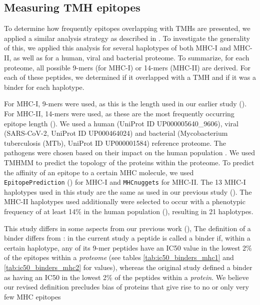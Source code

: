 \subsection{Measuring TMH epitopes}

To determine how frequently epitopes overlapping with TMHs are presented,
we applied a similar analysis strategy as described in \cite{bianchi2017}.
To investigate the generality of this, we applied this analysis
for several haplotypes of both MHC-I and MHC-II, 
as well as for a human, viral and bacterial proteome.
To summarize, for each proteome, 
all possible 9-mers (for MHC-I) or 14-mers (MHC-II) are derived. 
For each of these peptides, we determined if it overlapped with a 
TMH and if it was a binder for each haplotype.

For MHC-I, 9-mers were used, as this is the length used in our earlier
study (\cite{bianchi2017}). For MHC-II, 14-mers were used, 
as these are the most frequently occurring
epitope length (\cite{bergseng2015different}).
We used a human (UniProt ID UP000005640_9606), 
viral (SARS-CoV-2, UniProt ID UP000464024) 
and bacterial (Mycobacterium tuberculosis (MTb), UniProt ID UP000001584) 
reference proteome. The pathogens were chosen based 
on their impact on the human 
population .
We used TMHMM   to predict the topology 
of the proteins within the proteome.
To predict the affinity of an epitope to a certain MHC molecule,
we used \verb;EpitopePrediction; (\cite{bianchi2017}) for MHC-I 
and \verb;MHCnuggets;  for MHC-II.
The 13 MHC-I haplotypes used in this study are the same as 
used in our previous study (\cite{bianchi2017}).
The MHC-II haplotypes used additionally were selected 
to occur with a phenotypic frequency of at least 14\% in
the human population (\cite{greenbaum2011functional}),
resulting in 21 haplotypes.

This study differs in some aspects from our previous work (\cite{bianchi2017}), 
The definition of a binder differs from \cite{bianchi2017}:
in the current study a peptide is called a binder if, within a certain haplotype, 
any of its 9-mer peptides have an IC50 value in the lowest 2\% of 
the epitopes within a 
\emph{proteome} (see tables \ref{tab:ic50_binders_mhc1} and \ref{tab:ic50_binders_mhc2}
for values), whereas the original study defined
a binder as having an IC50 in the lowest 2\% 
of the peptides within a \emph{protein}.
We believe our revised definition precludes bias of proteins 
that give rise to no or only very few MHC epitopes

